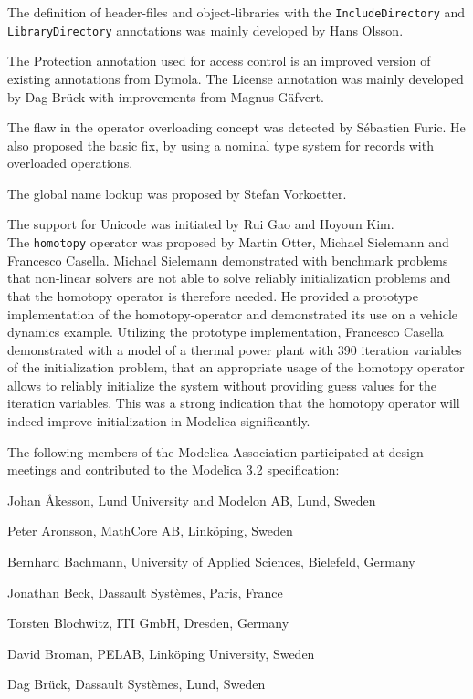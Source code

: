 The definition of header-files and object-libraries with the
\lstinline!IncludeDirectory! and \lstinline!LibraryDirectory! annotations was mainly
developed by Hans Olsson.

The Protection annotation used for access control is an improved version
of existing annotations from Dymola. The License annotation was mainly
developed by Dag Brück with improvements from Magnus Gäfvert.

The flaw in the operator overloading concept was detected by Sébastien
Furic. He also proposed the basic fix, by using a nominal type system
for records with overloaded operations.

The global name lookup was proposed by Stefan Vorkoetter.

The support for Unicode was initiated by Rui Gao and Hoyoun Kim.\\
The \lstinline!homotopy! operator was proposed by Martin Otter, Michael Sielemann
and Francesco Casella. Michael Sielemann demonstrated with benchmark
problems that non-linear solvers are not able to solve reliably
initialization problems and that the homotopy operator is therefore
needed. He provided a prototype implementation of the homotopy-operator
and demonstrated its use on a vehicle dynamics example. Utilizing the
prototype implementation, Francesco Casella demonstrated with a model of
a thermal power plant with 390 iteration variables of the initialization
problem, that an appropriate usage of the homotopy operator allows to
reliably initialize the system without providing guess values for the
iteration variables. This was a strong indication that the homotopy
operator will indeed improve initialization in Modelica significantly.

The following members of the Modelica Association participated at design
meetings and contributed to the Modelica 3.2 specification:

Johan Åkesson, Lund University and Modelon AB, Lund, Sweden

Peter Aronsson, MathCore AB, Linköping, Sweden

Bernhard Bachmann, University of Applied Sciences, Bielefeld, Germany

Jonathan Beck, Dassault Systèmes, Paris, France

Torsten Blochwitz, ITI GmbH, Dresden, Germany

David Broman, PELAB, Linköping University, Sweden

Dag Brück, Dassault Systèmes, Lund, Sweden

